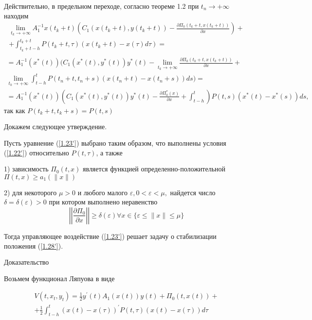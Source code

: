 Действительно, в предельном переходе, согласно теореме 1.2 при $t_n \to + \infty$ находим 
$$
\begin{array}{c}
\displaystyle \lim_{t_k \to + \infty} A_1^{-1} x(t_k + t) (C_1 (x(t_k + t), y(t_k + t)) - \frac{\partial \Pi_0 (t_k + t, x(t_k + t))}{\partial x})+\\
\displaystyle + \int_{t_k+t-h}^{t_k+t} P(t_k + t, \tau) (x(t_k + t) - x(\tau) d \tau)=\\
\end{array}
$$
$$
\begin{array}{c}
\displaystyle = A_1^{-1} (x^{*} (t)) (C_1 (x^{*}(t), y^{*}(t)) y^{*}(t) - \lim_{t_k \to + \infty} \frac{\partial \Pi_0 (t_k +t, x (t_k + t))}{\partial x} +\\
\displaystyle \lim_{t_k \to + \infty} \int_{t - h}^{t} P(t_n + t, t_n + s) ( x(t_n + t) - x(t_n + s)) ds) =\\
\displaystyle =A_1^{-1} ( x^{*} (t)) (C_1 (x^{*} (t), y^{*}(t)) y^{*} (t) - \frac{\partial \Pi_0^{*} (x)}{\partial x} + \int_{t - h}^{t}) P (t, s) (x^{*} (t) - x^{*} (s)) ds,
\end{array}
$$
так как $P(t_k + t, t_k + s) = P(t, s)$

Докажем следующее утверждение. 

\begin{theorem} \label{1.6'}
Пусть уравнение (\ref{1.23'}) выбрано таким образом, что выполнены условия (\ref{1.22'}) относительно $P(t, \tau)$, а также 

1) зависимость $\Pi_0 (t, x)$ является функцией определенно-положительной $\Pi (t, x) \ge a_1 (\| x \|)$

 2) для некоторого $\mu > 0$ и любого малого $\varepsilon, 0 < \varepsilon < \mu, $ найдется число $\delta = \delta (\varepsilon) > 0$ при котором выполнено неравенство $$\left| \left| \frac{\partial \Pi_0}{\partial x} \right| \right| \ge \delta (\varepsilon) \forall x \in \lbrace \varepsilon \le \| x \| \le \mu \rbrace$$

Тогда управляющее воздействие (\ref{1.23'}) решает задачу о стабилизации положения (\ref{1.28'}).
\end{theorem}

Доказательство

Возьмем функционал Ляпуова в виде 

\begin{equation} \label{1.26'}
	\begin{array}{c}
		\displaystyle V(t, x_t, y_t) = \frac12 y^{'} (t) A_1(x(t)) y(t) + \Pi_0(t, x(t)) +\\
		\displaystyle + \frac12 \int_{t-h}^{t} (x(t) - x(\tau))^{'} P(t, \tau) (x(t) - x (\tau)) d \tau
	\end{array}
\end{equation}

